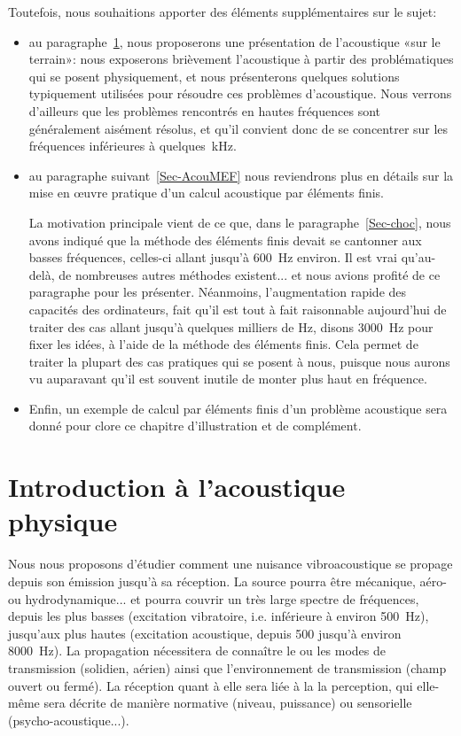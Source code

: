 Toutefois, nous souhaitions apporter des éléments supplémentaires sur le sujet: 
\begin{itemize}
   \item au paragraphe~\ref{Sec-AcouPhy}, nous proposerons une présentation de l'acoustique «sur le terrain»: nous exposerons brièvement l'acoustique à partir des problématiques qui se posent physiquement, et nous présenterons quelques solutions typiquement utilisées pour résoudre ces problèmes d'acoustique. Nous verrons d'ailleurs que les problèmes rencontrés en hautes fréquences sont généralement aisément résolus, et qu'il convient donc de se concentrer sur les fréquences inférieures à quelques~kHz.
   \item au paragraphe suivant~\ref{Sec-AcouMEF} nous reviendrons plus en détails sur la mise en œuvre pratique d'un calcul acoustique par éléments finis.
   
   La motivation principale vient de ce que, dans le paragraphe~\ref{Sec-choc}, nous avons indiqué que la méthode des éléments finis devait se cantonner aux basses fréquences, celles-ci allant jusqu'à 600~Hz environ. Il est vrai qu'au-delà, de nombreuses autres méthodes existent... et nous avions profité de ce paragraphe pour les présenter.
Néanmoins, l'augmentation rapide des capacités des ordinateurs, fait qu'il est tout à fait raisonnable aujourd'hui de traiter des cas allant jusqu'à quelques milliers de Hz, disons 3000~Hz pour fixer les idées, à l'aide de la méthode des éléments finis. Cela permet de traiter la plupart des cas pratiques qui se posent à nous, puisque nous aurons vu auparavant qu'il est souvent inutile de monter plus haut en fréquence.
   
   \item Enfin, un exemple de calcul par éléments finis d'un problème acoustique sera donné pour clore ce chapitre d'illustration et de complément.
\end{itemize}

\medskip

\medskip
\section{Introduction à l'acoustique physique}\label{Sec-AcouPhy}

Nous nous proposons d'étudier comment une nuisance vibroacoustique se propage depuis son émission jusqu'à sa réception.
La source pourra être mécanique, aéro- ou hydrodynamique... et pourra couvrir un très large spectre de fréquences, depuis les plus basses (excitation vibratoire, i.e. inférieure à environ 500~Hz), jusqu'aux plus hautes (excitation acoustique, depuis 500 jusqu'à environ 8000~Hz).
La propagation nécessitera de connaître le ou les modes de transmission (solidien, aérien) ainsi que l'environnement de transmission (champ ouvert ou fermé).
La réception quant à elle sera liée à la la perception, qui elle-même sera décrite de manière normative (niveau, puissance) ou sensorielle (psycho-acoustique...).


